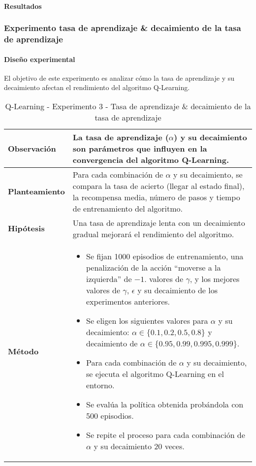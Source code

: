 \paragraph{Resultados}

\subsubsection{Experimento tasa de aprendizaje \& decaimiento de la tasa de aprendizaje}

\paragraph{Diseño experimental}
El objetivo de este experimento es analizar cómo la tasa de aprendizaje y su decaimiento afectan el rendimiento del algoritmo Q-Learning.

\begin{table}[H]
    \centering
    \begin{tabularx}{\textwidth}{|p{4cm}|X|} %
        \hline %
        \textbf{Observación} & La tasa de aprendizaje ($\alpha$) y su decaimiento son parámetros que influyen en la convergencia del algoritmo Q-Learning.
        \\ \hline 
        \textbf{Planteamiento} & Para cada combinación de $\alpha$ y su decaimiento, se compara la tasa de acierto (llegar al estado final), la recompensa media, número de pasos y tiempo de entrenamiento del algoritmo.
        \\ \hline 
        \textbf{Hipótesis} & Una tasa de aprendizaje lenta con un decaimiento gradual mejorará el rendimiento del algoritmo.
        \\ \hline 
        \textbf{Método} & 
        \begin{itemize}
            \item Se fijan 1000 episodios de entrenamiento, una penalización de la acción ``moverse a la izquierda'' de $-1$. valores de \(\gamma\), y los mejores valores de \(\gamma\), \(\epsilon\) y su decaimiento de los experimentos anteriores.
            \item Se eligen los siguientes valores para $\alpha$ y su decaimiento: $\alpha \in \{0.1, 0.2, 0.5, 0.8\}$ y decaimiento de $\alpha \in \{0.95, 0.99, 0.995, 0.999\}$.
            \item Para cada combinación de $\alpha$ y su decaimiento, se ejecuta el algoritmo Q-Learning en el entorno.
            \item Se evalúa la política obtenida probándola con 500 episodios.
            \item Se repite el proceso para cada combinación de $\alpha$ y su decaimiento 20 veces.
        \end{itemize}
        \\ \hline
    \end{tabularx}
    \caption{Q-Learning - Experimento 3 - Tasa de aprendizaje \& decaimiento de la tasa de aprendizaje}
    \label{tab:diseñoQLEarningExp3}
\end{table}

